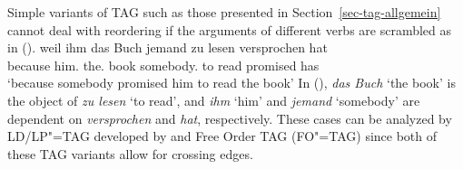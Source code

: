 Simple variants of TAG such as those presented in Section~\ref{sec-tag-allgemein} cannot deal with reordering if the arguments of different verbs
are scrambled as in ().
\ea
\label{ex-weil-ihm-das-Buch-jemand-zu-lesen-versprochen-hat-drei}
\gll weil    ihm das Buch jemand   zu lesen versprochen hat\footnotemark\\
     because him.\dat{} the.\acc{} book somebody.\nom{} to read promised has\\
\glt `because somebody promised him to read the book'
\z
In (), \emph{das Buch} `the book' is the object of \emph{zu lesen} `to read', and \emph{ihm}
`him' and \emph{jemand} `somebody' are dependent on \emph{versprochen} and \emph{hat}, respectively.
These cases can be analyzed by LD/LP"=TAG developed by \citet{Joshi87b} and Free Order TAG
(FO"=TAG) \citep*[]{BJR91a} since both of these TAG variants allow for
crossing edges.


